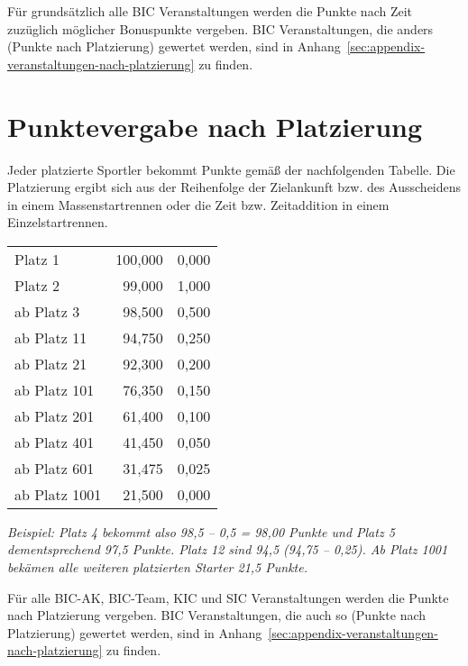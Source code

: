 Für grundsätzlich alle BIC Veranstaltungen werden die Punkte nach Zeit zuzüglich möglicher Bonuspunkte vergeben. BIC Veranstaltungen, die anders (Punkte nach Platzierung) gewertet werden, sind in Anhang~\ref{sec:appendix-veranstaltungen-nach-platzierung} zu finden.

\section{Punktevergabe nach Platzierung}
\label{sec:appendix-punkte-nach-platz}
Jeder platzierte Sportler bekommt Punkte gemäß der nachfolgenden Tabelle. Die Platzierung ergibt sich aus der Reihenfolge der Zielankunft bzw. des Ausscheidens in einem Massenstartrennen oder die Zeit bzw. Zeitaddition in einem Einzelstartrennen.

\begin{center}
\begin{tabular}{|l|r|r|}
	\hline
	\thead{Platz} &
	\thead{Punkte} &
	\thead{Abstand pro Platz} \\ \hline
	Platz 1       & 100,000 & 0,000 \\ \hline
	Platz 2       &  99,000 & 1,000 \\ \hline
	ab Platz 3    &  98,500 & 0,500 \\ \hline
	ab Platz 11   &  94,750 & 0,250 \\ \hline
	ab Platz 21   &  92,300 & 0,200 \\ \hline
	ab Platz 101  &  76,350 & 0,150 \\ \hline
	ab Platz 201  &  61,400 & 0,100 \\ \hline
	ab Platz 401  &  41,450 & 0,050 \\ \hline
	ab Platz 601  &  31,475 & 0,025 \\ \hline
	ab Platz 1001 &  21,500 & 0,000 \\ \hline
\end{tabular}
\end{center}

\textit{Beispiel: Platz 4 bekommt also 98,5 – 0,5 = 98,00 Punkte und Platz 5 dementsprechend 97,5 Punkte. Platz 12 sind 94,5 (94,75 – 0,25). Ab Platz 1001 bekämen alle weiteren platzierten Starter 21,5 Punkte.}

Für alle BIC-AK, BIC-Team, KIC und SIC Veranstaltungen werden die Punkte nach Platzierung vergeben. BIC Veranstaltungen, die auch so (Punkte nach Platzierung) gewertet werden, sind in Anhang~\ref{sec:appendix-veranstaltungen-nach-platzierung} zu finden.

